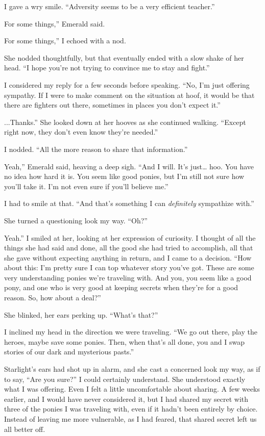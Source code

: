 I gave a wry smile. “Adversity seems to be a very efficient teacher.”

\leavevmode{}For some things,” Emerald said.

\leavevmode{}For some things,” I echoed with a nod.

She nodded thoughtfully, but that eventually ended with a slow shake of her head. “I hope you’re not trying to convince me to stay and fight.”

I considered my reply for a few seconds before speaking. “No, I’m just offering sympathy. If I were to make comment on the situation at hoof, it would be that there are fighters out there, sometimes in places you don’t expect it.”

\leavevmode{}...Thanks.” She looked down at her hooves as she continued walking. “Except right now, they don’t even know they’re needed.”

I nodded. “All the more reason to share that information.”

\leavevmode{}Yeah,” Emerald said, heaving a deep sigh. “And I will. It’s just… hoo. You have no idea how hard it is. You seem like good ponies, but I’m still not sure how you’ll take it. I’m not even sure if you’ll believe me.”

I had to smile at that. “And that’s something I can \textit{definitely} sympathize with.”

She turned a questioning look my way. “Oh?”

\leavevmode{}Yeah.” I smiled at her, looking at her expression of curiosity. I thought of all the things she had said and done, all the good she had tried to accomplish, all that she gave without expecting anything in return, and I came to a decision. “How about this: I’m pretty sure I can top whatever story you’ve got. These are some very understanding ponies we’re traveling with. And you, you seem like a good pony, and one who is very good at keeping secrets when they’re for a good reason. So, how about a deal?”

She blinked, her ears perking up. “What’s that?”

I inclined my head in the direction we were traveling. “We go out there, play the heroes, maybe save some ponies. Then, when that’s all done, you and I swap stories of our dark and mysterious pasts.”

Starlight’s ears had shot up in alarm, and she cast a concerned look my way, as if to say, “Are you sure?” I could certainly understand. She understood exactly what I was offering. Even I felt a little uncomfortable about sharing. A few weeks earlier, and I would have never considered it, but I had shared my secret with three of the ponies I was traveling with, even if it hadn’t been entirely by choice. Instead of leaving me more vulnerable, as I had feared, that shared secret left us all better off.

